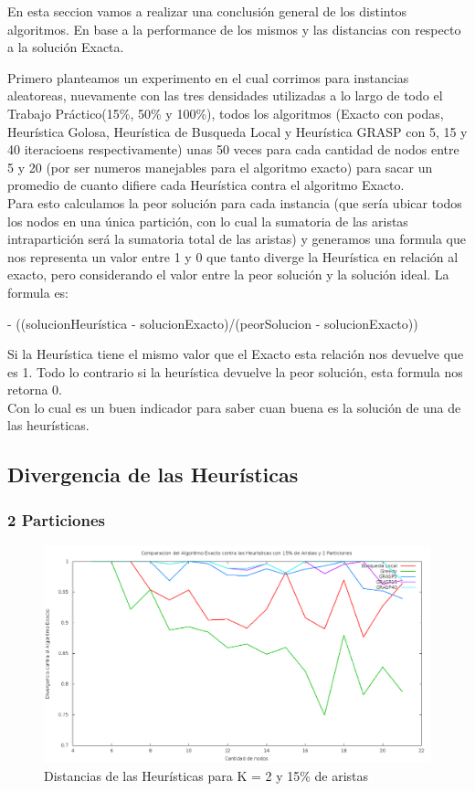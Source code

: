 En esta seccion vamos a realizar una conclusi\'on general de los distintos algoritmos. En base a la performance de los mismos y las distancias con respecto a la soluci\'on Exacta.

Primero planteamos un experimento en el cual corrimos para instancias aleatoreas, nuevamente con las tres densidades utilizadas a lo largo de todo el Trabajo Pr\'actico(15\%, 50\% y 100\%), todos los algoritmos (Exacto con podas, Heur\'istica Golosa, Heur\'istica de Busqueda Local y Heur\'istica GRASP con 5, 15 y 40 iteracioens respectivamente) unas 50 veces para cada cantidad de nodos entre 5 y 20 (por ser numeros manejables para el algoritmo exacto) para sacar un promedio de cuanto difiere cada Heur\'istica contra el algoritmo Exacto.\\
Para esto calculamos la peor soluci\'on para cada instancia (que ser\'ia ubicar todos los nodos en una \'unica partici\'on, con lo cual la sumatoria de las aristas intrapartici\'on ser\'a la sumatoria total de las aristas) y generamos una formula que nos representa un valor entre 1 y 0 que tanto diverge la Heur\'istica en relaci\'on al exacto, pero considerando el valor entre la peor soluci\'on y la soluci\'on ideal.
La formula es: 

 - ((solucionHeur\'istica - solucionExacto)/(peorSolucion - solucionExacto))
\ec

Si la Heur\'istica tiene el mismo valor que el Exacto esta relaci\'on nos devuelve que es 1. Todo lo contrario si la heur\'istica devuelve la peor soluci\'on, esta formula nos retorna 0.\\
Con lo cual es un buen indicador para saber cuan buena es la soluci\'on de una de las heur\'isticas.

\subsection{Divergencia de las Heur\'isticas}

\subsubsection{2 Particiones}

\begin{figure}[H]
\begin{center}
\includegraphics[scale=0.3]{finales/ComparacionesCon2Particiones15Aristas.png}
\caption{Distancias de las Heur\'isticas para K = 2 y 15\% de aristas}
\end{center}
\end{figure}

